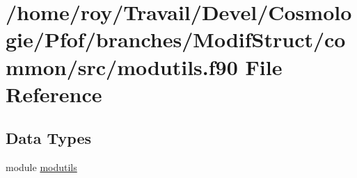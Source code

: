 \hypertarget{modutils_8f90}{\section{/home/roy/\-Travail/\-Devel/\-Cosmologie/\-Pfof/branches/\-Modif\-Struct/common/src/modutils.f90 File Reference}
\label{modutils_8f90}
}
\subsection*{Data Types}
\begin{DoxyCompactItemize}
\item 
module \hyperlink{classmodutils}{modutils}
\end{DoxyCompactItemize}
